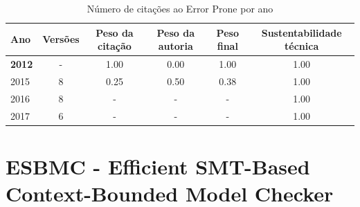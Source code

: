 \begin{table}[H]
\caption{Número de citações ao Error Prone por ano}
\centering
\begin{tabular}{| l | c | c | c | c | c |}
  \hline
  Ano & Versões & Peso da citação & Peso da autoria & Peso final & Sustentabilidade técnica \\
  \hline
            {\bf 2012}
          &
          -
          &
          1.00
          &
          0.00
          &
          1.00
          &
            {\color{blue} 1.00}
          \\
\hline
            2015
          &
          8
          &
          0.25
          &
          0.50
          &
          0.38
          &
            {\color{blue} 1.00}
          \\
\hline
        2016 & 8 & - & - & -
        &
          {\color{blue} 1.00}
        \\
\hline
        2017 & 6 & - & - & -
        &
          {\color{blue} 1.00}
        \\
\hline
\end{tabular}
\end{table}



\section{ESBMC - Efficient SMT-Based Context-Bounded Model Checker}


